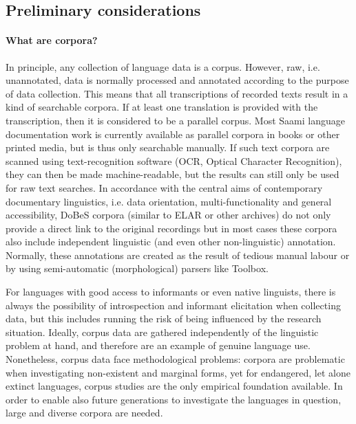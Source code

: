 \documentclass[a4paper,12pt]{article}
\begin{document}
\subsection{Preliminary considerations}
\paragraph{What are corpora?} In principle, any collection of language data is a corpus. However, raw, i.e. unannotated, data is normally processed and annotated according to the purpose of data collection. This means that all transcriptions of recorded texts result in a kind of searchable corpora. If at least one translation is provided with the transcription, then it is considered to be a parallel corpus. Most Saami language documentation work is currently available as parallel corpora in books or other printed media, but is thus only searchable manually. If such text corpora are scanned using text-recognition software (OCR, Optical Character Recognition), they can then be made machine-readable, but the results can still only be used for raw text searches. In accordance with the central aims of contemporary documentary linguistics, i.e. data orientation, multi-functionality and general accessibility, DoBeS corpora (similar to ELAR or other archives) do not only provide a direct link to the original recordings but in most cases these corpora also include independent linguistic (and even other non-linguistic) annotation. Normally, these annotations are created as the result of tedious manual labour or by using semi-automatic (morphological) parsers like Toolbox.

For languages with good access to informants or even native linguists, there is always the possibility of introspection and informant elicitation when collecting data, but this includes running the risk of being influenced by the research situation. Ideally, corpus data are gathered independently of the linguistic problem at hand, and therefore are an example of genuine language use. Nonetheless, corpus data face methodological problems: corpora are problematic when investigating non-existent and marginal forms, yet for endangered, let alone extinct languages, corpus studies are the only empirical foundation available. In order to enable also future generations to investigate the languages in question, large and diverse corpora are needed.
\end{document}

